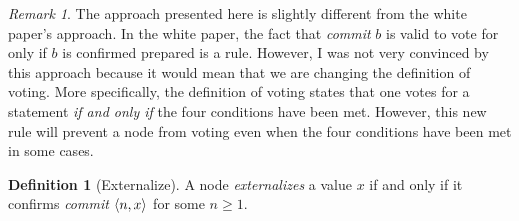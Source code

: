 \documentclass[12pt, psamsfonts]{amsart}
\theoremstyle{definition}
\newtheorem{defn}[thm]{Definition}
\theoremstyle{remark}
\newtheorem{rem}[thm]{Remark}
\numberwithin{equation}{subsection}
\begin{document}
\begin{rem}
    The approach presented here is slightly different from the white paper's approach.
    In the white paper, the fact that \textit{commit} $b$ is valid to vote for only if $b$ is confirmed prepared is a rule.
    However, I was not very convinced by this approach because it would mean that we are changing the definition of voting.
    More specifically, the definition of voting states that one votes for a statement \textit{if and only if} the four conditions have been met.  
    However, this new rule will prevent a node from voting even when the four conditions have been met in some cases.
\end{rem}

\begin{defn}[Externalize]
    A node \textit{externalizes} a value $x$ if and only if it confirms \textit{commit} $\ev{n, x}$ for some $n \geq 1$.
\end{defn}
\end{document}
